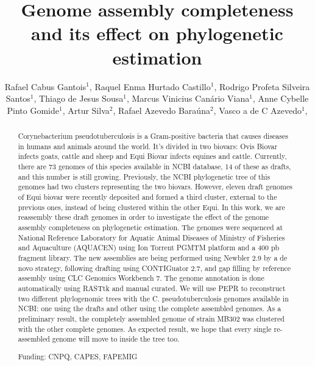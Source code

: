 \documentclass[twoside]{article}
\title{\vspace{-15mm}\fontsize{24pt}{10pt}\selectfont\textbf{ Genome assembly completeness and its effect on phylogenetic estimation }} %
\author{ Rafael Cabus Gantois$^{1}$, Raquel Enma Hurtado Castillo$^{1}$, Rodrigo Profeta Silveira Santos$^{1}$, Thiago de Jesus Sousa$^{1}$, Marcus Vinicius Canário Viana$^{1}$, Anne Cybelle Pinto Gomide$^{1}$, Artur Silva$^{2}$, Rafael Azevedo Baraúna$^{2}$, Vasco a de C Azevedo$^{1}$, }
\affil{ 1 Federal University of Minas Gerais

2 Federal University of Pará

 }
\date{}
\begin{document}
  
  
  \maketitle %
  
  
  \thispagestyle{fancy} %
  
  
  \begin{abstract}
  Corynebacterium pseudotuberculosis is a Gram-positive bacteria that causes diseases in humans and animals around the world. It’s divided in two biovars: Ovis Biovar infects goats, cattle and sheep and Equi Biovar infects equines and cattle. Currently, there are 73 genomes of this species available in NCBI database, 14 of these as drafts, and this number is still growing. Previously, the NCBI phylogenetic tree of this genomes had two clusters representing the two biovars. However, eleven draft genomes of Equi biovar were recently deposited and formed a third cluster, external to the previous ones, instead of being clustered within the other Equi. In this work, we are reassembly these draft genomes in order to investigate the effect of the genome assembly completeness on phylogenetic estimation. The genomes were sequenced at National Reference Laboratory for Aquatic Animal Diseases of Ministry of Fisheries and Aquaculture (AQUACEN) using Ion Torrent PGMTM platform and a 400 pb fragment library. The new assemblies are being performed using Newbler 2.9 by a de novo strategy, following drafting using CONTIGuator 2.7, and gap filling by reference assembly using CLC Genomics Workbench 7. The genome annotation is done automatically using RASTtk and manual curated. We will use PEPR to reconstruct two different phylogenomic trees with the C. pseudotuberculosis genomes available in NCBI: one using the drafts and other using the complete assembled genomes. As a preliminary result, the completely assembled genome of strain MB302 was clustered with the other complete genomes. As expected result, we hope that every single re-assembled genome will move to inside the tree too.
  
  Funding: CNPQ, CAPES, FAPEMIG \\ 
  \end{abstract}
  
\end{document}
